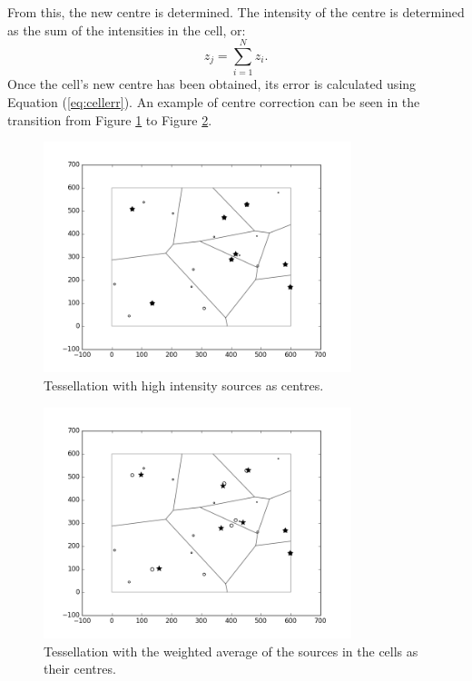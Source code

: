 From this, the new centre is determined. The intensity of the centre is determined as the sum of the intensities in the cell, or:
\begin{equation}
	z_j = \sum^N_{i=1} z_i.
\end{equation}
Once the cell's new centre has been obtained, its error is calculated using Equation (\ref{eq:cellerr}). An example of centre correction can be seen in the transition from Figure \ref{fig:recen1} to Figure \ref{fig:recen2}.
\begin{figure}[H]
  \centering
  \includegraphics[width=0.8\textwidth]{Images/recentre1.png}
  \caption{Tessellation with high intensity sources as centres.}
  \label{fig:recen1}
\end{figure}
\begin{figure}[H]
  \centering
  \includegraphics[width=0.8\textwidth]{Images/recentre2.png}
  \caption{Tessellation with the weighted average of the sources in the cells as their centres.}
  \label{fig:recen2}
\end{figure}